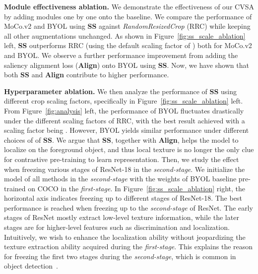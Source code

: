 \textbf{Module effectiveness ablation.}\quad
We demonstrate the effectiveness of our CVSA by adding modules one by one onto the baseline. We compare the performance of MoCo.v2 and BYOL using \textbf{SS} against \textit{RandomResizedCrop} (RRC) while keeping all other augmentations unchanged. As shown in Figure~\ref{fig:ss_scale_ablation} left, \textbf{SS} outperforms RRC (using the default scaling factor of ) both for MoCo.v2 and BYOL. We observe a further performance improvement from adding the saliency alignment loss (\textbf{Align}) onto BYOL using \textbf{SS}. Now, we have shown that both \textbf{SS} and \textbf{Align} contribute to higher performance.

\textbf{Hyperparameter ablation.}\quad
We then analyze the performance of \textbf{SS} using different crop scaling factors, specifically  in Figure~\ref{fig:ss_scale_ablation} left. From Figure~\ref{fig:analysis} left, the performance of BYOL fluctuates drastically under the different scaling factors of RRC, with the best result achieved with a scaling factor being . However, BYOL yields similar performance under different choices of  of \textbf{SS}. We argue that \textbf{SS}, together with \textbf{Align}, helps the model to localize on the foreground object, and thus local texture is no longer the only clue for contrastive pre-training to learn representation. Then, we study the effect when freezing various stages of ResNet-18 in the \textit{second-stage}. We initialize the model of all methods in the \textit{second-stage} with the weights of BYOL baseline pre-trained on COCO in the \textit{first-stage}. In Figure~\ref{fig:ss_scale_ablation} right, the horizontal axis indicates freezing up to different stages of ResNet-18. The best performance is reached when freezing up to the \textit{second-stage} of ResNet. The early stages of ResNet mostly extract low-level texture information, while the later stages are for higher-level features such as discrimination and localization. Intuitively, we wish to enhance the localization ability without jeopardizing the texture extraction ability acquired during the \textit{first-stage}. This explains the reason for freezing the first two stages during the \textit{second-stage}, which is common in object detection~\cite{NIPS2015_14bfa6bb}.

